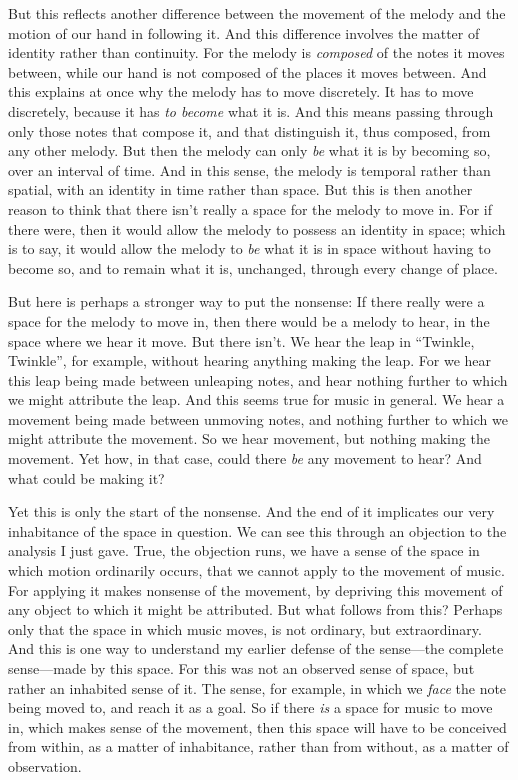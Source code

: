 \documentclass[12pt]{memoir}
\begin{document}
But this reflects another difference between the movement of the melody
and the motion of our hand in following it. And this difference involves
the matter of identity rather than continuity. For the melody is
\emph{composed} of the notes it moves between, while our hand is not
composed of the places it moves between. And this explains at once why
the melody has to move discretely. It has to move discretely, because it
has \emph{to become} what it is. And this means passing through only
those notes that compose it, and that distinguish it, thus composed,
from any other melody. But then the melody can only \emph{be} what it is
by becoming so, over an interval of time. And in this sense, the melody
is temporal rather than spatial, with an identity in time rather than
space. But this is then another reason to think that there isn't really
a space for the melody to move in. For if there were, then it would
allow the melody to possess an identity in space; which is to say, it
would allow the melody to \emph{be} what it is in space without having
to become so, and to remain what it is, unchanged, through every change
of place.

But here is perhaps a stronger way to put the nonsense: If there really
were a space for the melody to move in, then there would be a melody to
hear, in the space where we hear it move. But there isn't. We hear the
leap in ``Twinkle, Twinkle'', for example, without hearing anything
making the leap. For we hear this leap being made between unleaping
notes, and hear nothing further to which we might attribute the leap.
And this seems true for music in general. We hear a movement being made
between unmoving notes, and nothing further to which we might attribute
the movement. So we hear movement, but nothing making the movement. Yet
how, in that case, could there \emph{be} any movement to hear? And what
could be making it?

Yet this is only the start of the nonsense. And the end of it implicates
our very inhabitance of the space in question. We can see this through
an objection to the analysis I just gave. True, the objection runs, we
have a sense of the space in which motion ordinarily occurs, that we
cannot apply to the movement of music. For applying it makes nonsense of
the movement, by depriving this movement of any object to which it might
be attributed. But what follows from this? Perhaps only that the space
in which music moves, is not ordinary, but extraordinary. And this is
one way to understand my earlier defense of the sense---the complete
sense---made by this space. For this was not an observed sense of space,
but rather an inhabited sense of it. The sense, for example, in which we
\emph{face} the note being moved to, and reach it as a goal. So if there
\emph{is} a space for music to move in, which makes sense of the
movement, then this space will have to be conceived from within, as a
matter of inhabitance, rather than from without, as a matter of
observation.
\end{document}
